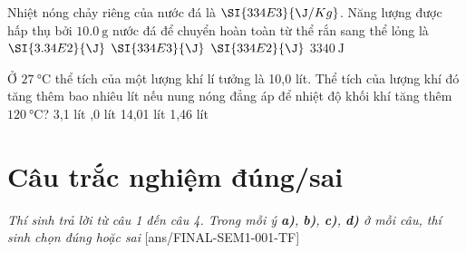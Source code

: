 \begin{ex}
	Nhiệt nóng chảy riêng của nước đá là $\SI{334E3}{\J/Kg}$. Năng lượng được hấp thụ bởi $\SI{10.0}{\g}$ nước đá để chuyển hoàn toàn từ thể rắn sang thể lỏng là
	\choice
	{$\SI{3.34E2}{\J}$}
	{$\SI{334E3}{\J}$}
	{$\SI{334E2}{\J}$}
	{\True $\SI{3340}{\J}$}
	\loigiai{}
\end{ex}
\begin{ex}
	Ở $\SI{27}{\celsius}$ thể tích của một lượng khí lí tưởng là 10,0 lít. Thể tích của lượng khí đó tăng thêm bao nhiêu lít nếu nung nóng đẳng áp để nhiệt độ khối khí tăng thêm $\SI{120}{\celsius}$? 
	\choice
	{3,1 lít}
	{,0 lít}
	{14,01 lít}
	{1,46 lít}
	\loigiai{}
\end{ex}
\section{Câu trắc nghiệm đúng/sai} 
\textit{Thí sinh trả lời từ câu 1 đến câu 4. Trong mỗi ý \textbf{a)}, \textbf{b)}, \textbf{c)}, \textbf{d)} ở mỗi câu, thí sinh chọn đúng hoặc sai}
\setcounter{ex}{0}
[ans/FINAL-SEM1-001-TF]

